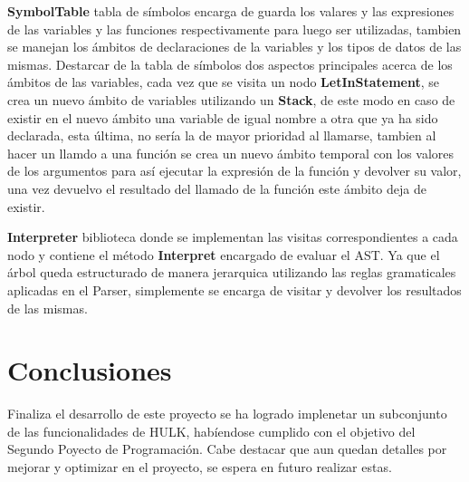 \documentclass[a4paper,12pt]{article}
\begin{document}
	\textbf{SymbolTable} tabla de símbolos encarga de guarda los valares y las expresiones de las variables y las funciones respectivamente para luego ser utilizadas, tambien se manejan los ámbitos de declaraciones de la variables y los tipos de datos de las mismas. Destarcar de la tabla de símbolos dos aspectos principales acerca de los ámbitos de las variables, cada vez que se visita un nodo \textbf{LetInStatement}, se crea un nuevo ámbito de variables utilizando un \textbf{Stack}, de este modo en caso de existir en el nuevo ámbito una variable de igual nombre a otra que ya ha sido declarada, esta última, no sería la de mayor prioridad al llamarse, tambien al hacer un llamdo a una función se crea un nuevo ámbito temporal con los valores de los argumentos para así ejecutar la expresión de la función y devolver su valor, una vez devuelvo el resultado del llamado de la función este ámbito deja de existir.
	
	\textbf{Interpreter} biblioteca donde se implementan las visitas correspondientes a cada nodo y contiene el método \textbf{Interpret} encargado de evaluar el AST. Ya que el árbol queda estructurado de manera jerarquica utilizando las reglas gramaticales aplicadas en el Parser, simplemente se encarga de visitar y devolver los resultados de las mismas.
	
	\section{Conclusiones}\label{sec:desarrollo}
	Finaliza el desarrollo de este proyecto se ha logrado implenetar un subconjunto de las funcionalidades de HULK, habíendose cumplido con el objetivo del Segundo Poyecto de Programación. Cabe destacar que aun quedan detalles por mejorar y optimizar en el proyecto, se espera en futuro realizar estas.
\end{document}
